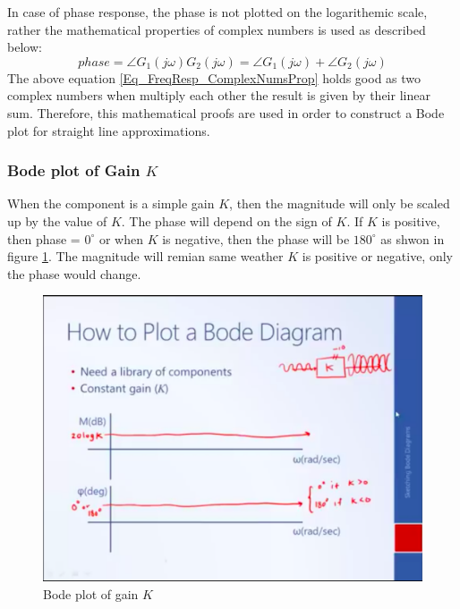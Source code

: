 In case of phase response, the phase is not plotted on the logarithemic scale, rather the mathematical properties of complex numbers is used as described below:
\begin{equation}
	phase = \angle G_{1}(j \omega) G_{2}(j \omega) = \angle G_{1}(j \omega) + \angle G_{2}(j \omega) \label{Eq_FreqResp_ComplexNumsProp}
\end{equation}
The above equation \eqref{Eq_FreqResp_ComplexNumsProp} holds good as two complex numbers when multiply each other the result is given by their linear sum. Therefore, this mathematical proofs are used in order to construct a Bode plot for straight line approximations.

\subsubsection{Bode plot of Gain $K$} \label{Sec_BodePlotGain}

When the component is a simple gain $K$, then the magnitude will only be scaled up by the value of $K$. The phase will depend on the sign of $K$. If $K$ is positive, then phase = $0^{\circ}$ or when $K$ is negative, then the phase will be $180^{\circ}$ as shwon in figure \ref{Fig_FreqResp_BodePlot_K}. The magnitude will remian same weather $K$ is positive or negative, only the phase would change.
\begin{figure}[h!]
	\centering
	\includegraphics[width=\linewidth]{Bilder/FreqResp_BodePlot_K}
	\caption{Bode plot of gain $K$}
	\label{Fig_FreqResp_BodePlot_K}
\end{figure}

